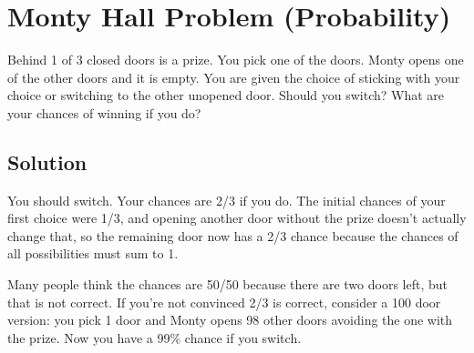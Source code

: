 \section{Monty Hall Problem (Probability)}
Behind 1 of 3 closed doors is a prize. You pick one of the doors. Monty opens one of the other doors and it is empty. You are given the choice of sticking with your choice or switching to the other unopened door. Should you switch? What are your chances of winning if you do?

\subsection{Solution}
You should switch. Your chances are 2/3 if you do. The initial chances of your first choice were 1/3, and opening another door without the prize doesn't actually change that, so the remaining door now has a 2/3 chance because the chances of all possibilities must sum to 1.

Many people think the chances are 50/50 because there are two doors left, but that is not correct. If you're not convinced 2/3 is correct, consider a 100 door version: you pick 1 door and Monty opens 98 other doors avoiding the one with the prize. Now you have a 99\% chance if you switch.

